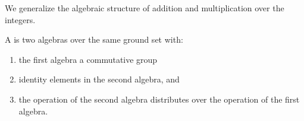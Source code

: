 
\sbasic



\sstart



We generalize the algebraic structure of
addition and multiplication over the
integers.


A  is two algebras over
the same ground set with:

\begin{enumerate}
  \item
  the first algebra a commutative group

  \item
  identity elements in the second algebra,
  and

  \item
  the operation of the second algebra
  distributes over the operation of the
  first algebra.
\end{enumerate}



\strats

